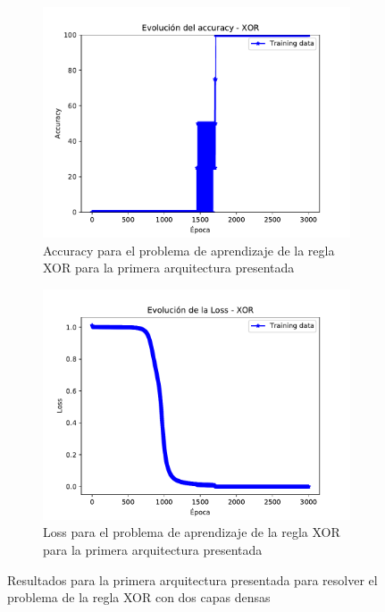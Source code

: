 \begin{figure}[H]
     \centering
     \begin{subfigure}[b]{0.45\textwidth}
         \centering
         \includegraphics[width=\textwidth]{image/TP2_6_acc_a.pdf}
         \caption{Accuracy para el problema de aprendizaje de la regla XOR para la primera arquitectura presentada}
         \label{fig:acc6a}
     \end{subfigure}
     \hfill
     \begin{subfigure}[b]{0.45\textwidth}
         \centering
         \includegraphics[width=\textwidth]{image/TP2_6_Loss_a.pdf}
         \caption{Loss para el problema de aprendizaje de la regla XOR para la primera arquitectura presentada}
         \label{fig:loss6a}
     \end{subfigure}
        \caption{Resultados para la primera arquitectura presentada para resolver el problema de la regla XOR con dos capas densas}
        \label{fig:resu6a}
\end{figure}

